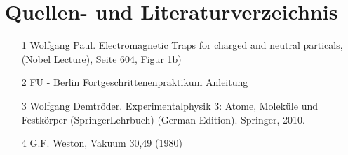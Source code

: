 \section{Quellen- und Literaturverzeichnis}
\begin{itemize}
\item [1] Wolfgang Paul. Electromagnetic Traps for charged and neutral particals,\\ (Nobel Lecture), Seite 604, Figur 1b)
\item [2] FU - Berlin Fortgeschrittenenpraktikum Anleitung
\item [3] Wolfgang Demtröder. Experimentalphysik 3: Atome, Moleküle und Festkörper (SpringerLehrbuch) (German Edition). Springer, 2010.
\item [4] G.F. Weston, Vakuum 30,49 (1980)
\end{itemize} 
